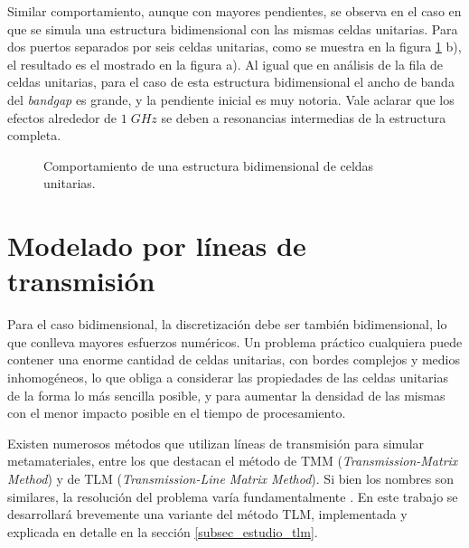 Similar comportamiento, aunque con mayores pendientes, se observa en el caso en que se simula una estructura bidimensional con las mismas celdas unitarias. Para dos puertos separados por seis celdas unitarias, como se muestra en la figura \ref{fig:s12-estructura2d-super} b), el resultado es el mostrado en la figura a). Al igual que en análisis de la fila de celdas unitarias, para el caso de esta estructura bidimensional el ancho de banda del \textit{bandgap} es grande, y la pendiente inicial es muy notoria. Vale aclarar que los efectos alrededor de $1\; GHz$ se deben a resonancias intermedias de la estructura completa.


\begin{figure}[h]
	\centering 
	\hspace{0pt}
	\caption{Comportamiento de una estructura bidimensional de celdas unitarias.}
	\label{fig:s12-estructura2d-super}	
\end{figure}  



\section{Modelado por líneas de transmisión}

Para el caso bidimensional, la discretización debe ser también bidimensional, lo que conlleva mayores esfuerzos numéricos. Un problema práctico cualquiera puede contener una enorme cantidad de celdas unitarias, con bordes complejos y medios inhomogéneos, lo que obliga a considerar las propiedades de las celdas unitarias de la forma lo más sencilla posible, y para aumentar la densidad de las mismas con el menor impacto posible en el tiempo de procesamiento.

Existen numerosos métodos que utilizan líneas de transmisión para simular metamateriales, entre los que destacan el método de TMM (\textit{Transmission-Matrix Method}) y de TLM (\textit{Transmission-Line Matrix Method}). Si bien los nombres son similares, la resolución del problema varía fundamentalmente \cite{Caloz:ElectromagneticMetamaterials}. En este trabajo se desarrollará brevemente una variante del método TLM, implementada y explicada en detalle en la sección \ref{subsec_estudio_tlm}.

